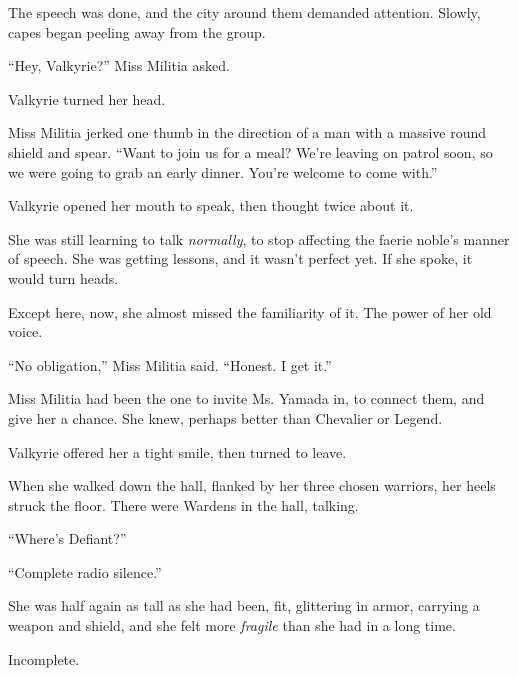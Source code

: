 The speech was done, and the city around them demanded attention.  Slowly, capes began peeling away from the group.



``Hey, Valkyrie?'' Miss Militia asked.



Valkyrie turned her head.



Miss Militia jerked one thumb in the direction of a man with a massive round shield and spear.  ``Want to join us for a meal?  We're leaving on patrol soon, so we were going to grab an early dinner.  You're welcome to come with.''



Valkyrie opened her mouth to speak, then thought twice about it.



She was still learning to talk \emph{normally}, to stop affecting the faerie noble's manner of speech.  She was getting lessons, and it wasn't perfect yet.  If she spoke, it would turn heads.



Except here, now, she almost missed the familiarity of it.  The power of her old voice.



``No obligation,'' Miss Militia said.  ``Honest.  I get it.''



Miss Militia had been the one to invite Ms. Yamada in, to connect them, and give her a chance.  She knew, perhaps better than Chevalier or Legend.



Valkyrie offered her a tight smile, then turned to leave.



When she walked down the hall, flanked by her three chosen warriors, her heels struck the floor.  There were Wardens in the hall, talking.



``Where's Defiant?''



``Complete radio silence.''



She was half again as tall as she had been, fit, glittering in armor, carrying a weapon and shield, and she felt more \emph{fragile }than she had in a long time.



Incomplete.



